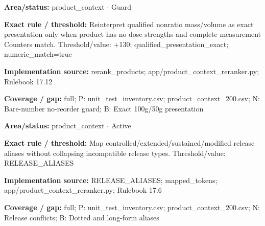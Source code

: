 \begin{tcolorbox}[enhanced,breakable,colback=white,colframe=Muted!45,boxrule=0.45pt,arc=1.5pt,left=6pt,right=6pt,top=5pt,bottom=5pt,title={\texttt{PC-QUALIFIED-PRESENTATION-16}},title after break={\texttt{PC-QUALIFIED-PRESENTATION-16}\ (continued)},fonttitle=\headingfont\bfseries\color{Navy},coltitle=Navy]
\textbf{Area/status:} product\_\allowbreak{}context $\boldsymbol{\cdot}$ Guard\par
\smallskip
\textbf{Exact rule / threshold:} Reinterpret qualified nonratio mass/\allowbreak{}volume as exact presentation only when product has no dose strengths and complete measurement Counters match. Threshold/\allowbreak{}value: +130; qualified\_\allowbreak{}presentation\_\allowbreak{}exact; numeric\_\allowbreak{}match=true\par
\smallskip
\textbf{Implementation source:} rerank\_\allowbreak{}products; app/\allowbreak{}product\_\allowbreak{}context\_\allowbreak{}reranker.py; Rulebook 17.12\par
\smallskip
\textbf{Coverage / gap:} full; P: unit\_\allowbreak{}test\_\allowbreak{}inventory.csv; product\_\allowbreak{}context\_\allowbreak{}200.csv; N: Bare-number no-reorder guard; B: Exact 100g/\allowbreak{}50g presentation
\end{tcolorbox}
\begin{tcolorbox}[enhanced,breakable,colback=white,colframe=Muted!45,boxrule=0.45pt,arc=1.5pt,left=6pt,right=6pt,top=5pt,bottom=5pt,title={\texttt{PC-RELEASE-ALIASES-08}},title after break={\texttt{PC-RELEASE-ALIASES-08}\ (continued)},fonttitle=\headingfont\bfseries\color{Navy},coltitle=Navy]
\textbf{Area/status:} product\_\allowbreak{}context $\boldsymbol{\cdot}$ Active\par
\smallskip
\textbf{Exact rule / threshold:} Map controlled/\allowbreak{}extended/\allowbreak{}sustained/\allowbreak{}modified release aliases without collapsing incompatible release types. Threshold/\allowbreak{}value: RELEASE\_\allowbreak{}ALIASES\par
\smallskip
\textbf{Implementation source:} RELEASE\_\allowbreak{}ALIASES; mapped\_\allowbreak{}tokens; app/\allowbreak{}product\_\allowbreak{}context\_\allowbreak{}reranker.py; Rulebook 17.6\par
\smallskip
\textbf{Coverage / gap:} full; P: unit\_\allowbreak{}test\_\allowbreak{}inventory.csv; product\_\allowbreak{}context\_\allowbreak{}200.csv; N: Release conflicts; B: Dotted and long-form aliases
\end{tcolorbox}
